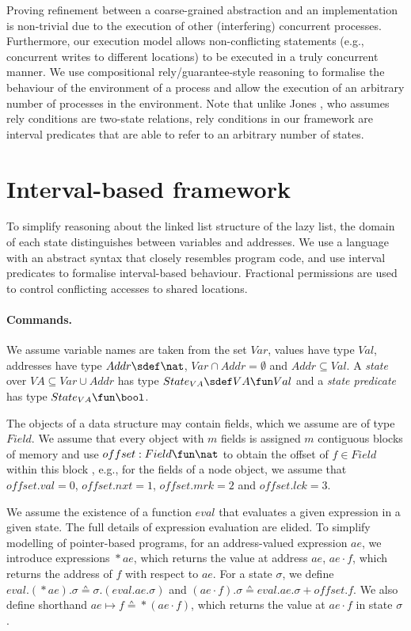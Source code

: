 \documentclass{article}
\def\cdota{\!\cdot\!}
\theoremstyle{plain}
\theoremstyle{definition}
\def \deref{\mathop{*}}
\begin{document}
Proving refinement between a coarse-grained abstraction and an
implementation is non-trivial due to the execution of other
(interfering) concurrent processes. Furthermore, our execution model
allows non-conflicting statements (e.g., concurrent writes to
different locations) to be executed in a truly concurrent manner. We
use compositional rely/guarantee-style reasoning \cite{Jon83} to
formalise the behaviour of the environment of a process and allow the
execution of an arbitrary number of processes in the environment. Note
that unlike Jones \cite{Jon83}, who assumes rely conditions are
two-state relations, rely conditions in our framework are interval
predicates that are able to refer to an arbitrary number of states.
 





\section{Interval-based framework}
\label{sec:an-interval-based}

To simplify reasoning about the linked list structure of the lazy
list, the domain of each state distinguishes between variables and
addresses. We use a language with an abstract syntax that closely
resembles program code, and use interval predicates to formalise
interval-based behaviour. Fractional permissions are used to control
conflicting accesses to shared locations.


\paragraph{Commands.}
We assume variable names are taken from the set $Var$, values have
type $Val$, addresses have type $Addr \sdef \nat$, $Var \cap Addr =
\emptyset$ and $Addr \subseteq Val$. A \emph{state} over $VA \subseteq
Var \cup Addr$ has type $State_{VA} \sdef VA \fun Val$
and a \emph{state predicate} has type $State_{VA} \fun \bool$.

The objects of a data structure may contain fields, which we assume
are of type $Field$. We assume that every object with $m$ fields is
assigned $m$ contiguous blocks of memory and use $offset : Field \fun
\nat$ to obtain the offset of $f \in Field$ within this block
\cite{Vaf07}, e.g., for the fields of a node object, we assume that
$offset.val = 0$, $offset.nxt = 1$, $offset.mrk = 2$ and $offset.lck =
3$.

We assume the existence of a function $eval$ that evaluates a given
expression in a given state. The full details of expression evaluation
are elided. To simplify modelling of pointer-based programs, for an
address-valued expression $ae$, we introduce expressions $\deref ae$,
which returns the value at address $ae$, $ae \cdota f$, which returns
the address of $f$ with respect to $ae$. For a state $\sigma$, we
define $eval.(\deref ae).\sigma \sdef \sigma.(eval.ae.\sigma)$ and
$(ae \cdota f).\sigma \sdef eval.ae.\sigma + offset.f$. We also define
shorthand $ae \mapsto f \sdef \deref (ae \cdota f) $, which returns
the value at $ae \cdota f$ in state $\sigma$.
\end{document}
